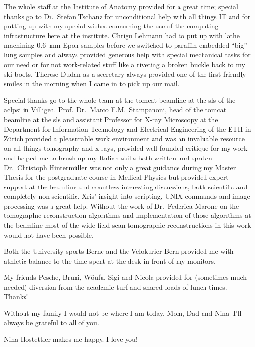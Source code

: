 The whole staff at the Institute of Anatomy provided for a great time; special thanks go to Dr.\ Stefan Tschanz for unconditional help with all things IT and for putting up with my special wishes concerning the use of the computing infrastructure here at the institute. Chrigu Lehmann had to put up with lathe machining \SI{0.6}{\milli\meter} Epon samples before we switched to paraffin embedded ``big'' lung samples and always provided generous help with special mechanical tasks for our need or for not work-related stuff like a riveting a broken buckle back to my ski boots. Therese Dudan as a secretary always provided one of the first friendly smiles in the morning when I came in to pick up our mail.

Special thanks go to the whole team at the \acs{tomcat} beamline at the \acl{sls} of the acl{psi} in Villigen. Prof.\ Dr.\ Marco F.M.\ Stampanoni, head of the \acs{tomcat} beamline at the \acl{sls} and assistant Professor for X-ray Microscopy at the Department for Information Technology and Electrical Engineering of the ETH in Zürich provided a pleasurable work environment and was an invaluable resource on all things tomography and x-rays, provided well founded critique for my work and helped me to brush up my Italian skills both written and spoken. Dr.\ Christoph Hintermüller was not only a great guidance during my Master Thesis for the postgraduate course in Medical Physics but provided expert support at the beamline and countless interesting discussions, both scientific and completely non-scientific. Xris' insight into scripting, UNIX commands and image processing was a great help. Without the work of Dr.\ Federica Marone on the tomographic reconstruction algorithms and implementation of those algorithms at the beamline most of the wide-field-scan tomographic reconstructions in this work would not have been possible.

Both the University sports Berne and the Velokurier Bern provided me with athletic balance to the time spent at the desk in front of my monitors.

My friends Pesche, Bruni, Wöufu, Sigi and Nicola provided for (sometimes much needed) diversion from the academic turf and shared loads of lunch times. Thanks!

Without my family I would not be where I am today. Mom, Dad and Nina, I'll always
be grateful to all of you.

Nina  Hostettler makes me happy. I love you!
\endgroup